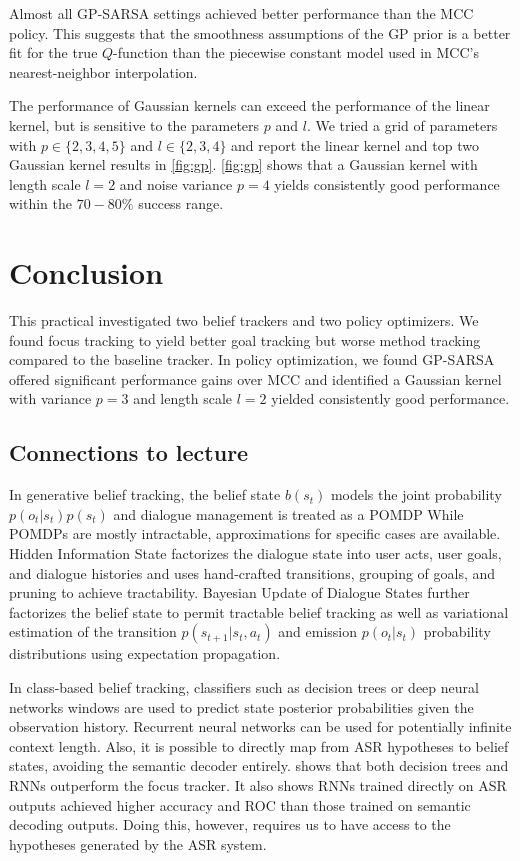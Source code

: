 \documentclass[a4paper,oneside,reqno]{amsart}
\begin{document}
Almost all GP-SARSA settings achieved better performance than the MCC policy.
This suggests that the smoothness assumptions of the GP prior is a better fit
for the true $Q$-function than the piecewise constant model used in MCC's
nearest-neighbor interpolation.

The performance of Gaussian kernels can exceed the performance of the linear
kernel, but is sensitive to the parameters $p$ and $l$. We tried a grid of
parameters with $p \in \{2,3,4,5\}$ and $l \in \{2,3,4\}$ and report the linear
kernel and top two Gaussian kernel results in \autoref{fig:gp}.
\autoref{fig:gp} shows that a Gaussian kernel with length scale $l=2$ and noise
variance $p=4$ yields consistently good performance within the $70-80\%$
success range.

\section{Conclusion}\label{sec:conclusion}

This practical investigated two belief trackers and two policy optimizers. We
found focus tracking to yield better goal tracking but worse method tracking
compared to the baseline tracker. In policy optimization, we found GP-SARSA
offered significant performance gains over MCC and identified a Gaussian kernel
with variance $p=3$ and length scale $l=2$ yielded consistently good
performance.

\subsection{Connections to lecture}

In generative belief tracking, the belief state $b(s_t)$ models the joint
probability $p(o_t|s_t)p(s_t)$ and dialogue management is treated as a POMDP
While POMDPs are mostly intractable, approximations for specific cases are
available. Hidden Information State\cite{young2010hidden}
factorizes the dialogue state into user acts, user goals, and dialogue
histories and uses hand-crafted transitions, grouping of goals, and pruning to
achieve tractability. Bayesian Update of Dialogue
States\cite{thomson2010bayesian} further factorizes the belief state to permit
tractable belief tracking as well as variational estimation of the transition
$p(s_{t+1}|s_t,a_t)$ and emission $p(o_t|s_t)$ probability distributions using
expectation propagation.

In class-based belief tracking, classifiers such as decision
trees\cite{williams2014web} or deep neural networks
windows\cite{henderson2014word} are used to predict state posterior
probabilities given the observation history. Recurrent neural networks can be
used for potentially infinite context length\cite{henderson2015discriminative}.
Also, it is possible to directly map from ASR hypotheses to belief states,
avoiding the semantic decoder entirely\cite{henderson2014word}. \cite{lect4}
shows that both decision trees and RNNs outperform the focus tracker. It also
shows RNNs trained directly on ASR outputs achieved higher accuracy and ROC
than those trained on semantic decoding outputs. Doing this, however, requires
us to have access to the hypotheses generated by the ASR system.
\end{document}

